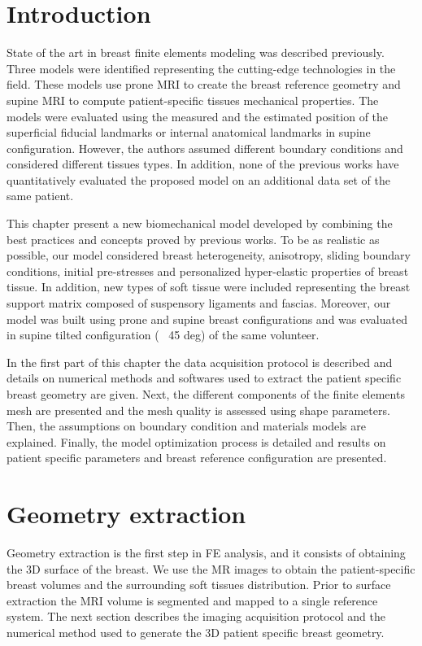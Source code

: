 \section{Introduction}\label{setion:introductionMyBioMecaModel}
State of the art in breast finite elements modeling was described previously. Three models were identified representing the cutting-edge technologies in the field. These models use prone MRI to create the breast reference geometry and supine MRI to compute patient-specific tissues mechanical properties. The models were evaluated using the measured and the estimated position of the superficial fiducial landmarks or internal anatomical landmarks in supine configuration.   However, the authors assumed different boundary conditions and considered different tissues types.  
In addition, none of the previous works have quantitatively evaluated the proposed model on an additional data set of the same patient. 

 This chapter present a new biomechanical model developed by combining the best practices and concepts proved by previous works. To be as realistic as possible, our model considered breast heterogeneity, anisotropy, sliding boundary conditions, initial pre-stresses and personalized hyper-elastic properties of breast tissue. In addition, new types of soft tissue were included representing the breast support matrix composed of suspensory ligaments and fascias. Moreover, our model was built using prone and supine breast configurations and was evaluated in supine tilted configuration (~ 45 deg) of the same volunteer.

In the first part of this chapter the data acquisition protocol is described and details on numerical methods and softwares used to extract the patient specific breast geometry are given. Next, the different components of the finite elements mesh are presented and the mesh quality is assessed using shape parameters.  Then, the assumptions on boundary condition and materials models are explained. Finally, the model optimization process is detailed and results on patient specific parameters and breast reference configuration are presented.   
\clearpage
\section{Geometry extraction}\label{section:geometryextraction}

Geometry extraction is the first step in FE analysis, and it
consists of obtaining the 3D surface of the
breast. We use the MR images to obtain the patient-specific breast volumes and the surrounding soft tissues distribution. Prior to surface extraction the MRI volume is segmented and mapped to a single reference system. The next section describes the imaging acquisition protocol and the numerical method used to generate the 3D patient specific breast geometry.

